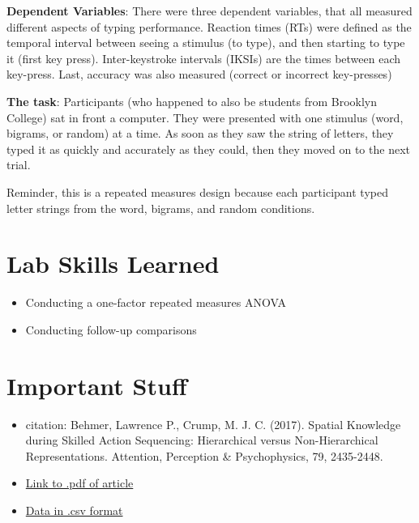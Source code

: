 \documentclass[]{book}
\providecommand{\tightlist}{%
  \setlength{\itemsep}{0pt}\setlength{\parskip}{0pt}}
\theoremstyle{definition}
\theoremstyle{definition}
\theoremstyle{definition}
\theoremstyle{remark}
\begin{document}
\textbf{Dependent Variables}: There were three dependent variables, that
all measured different aspects of typing performance. Reaction times
(RTs) were defined as the temporal interval between seeing a stimulus
(to type), and then starting to type it (first key press).
Inter-keystroke intervals (IKSIs) are the times between each key-press.
Last, accuracy was also measured (correct or incorrect key-presses)

\textbf{The task}: Participants (who happened to also be students from
Brooklyn College) sat in front a computer. They were presented with one
stimulus (word, bigrams, or random) at a time. As soon as they saw the
string of letters, they typed it as quickly and accurately as they
could, then they moved on to the next trial.

Reminder, this is a repeated measures design because each participant
typed letter strings from the word, bigrams, and random conditions.

\section{Lab Skills Learned}\label{lab-skills-learned-3}

\begin{itemize}
\tightlist
\item
  Conducting a one-factor repeated measures ANOVA
\item
  Conducting follow-up comparisons
\end{itemize}

\section{Important Stuff}\label{important-stuff-3}

\begin{itemize}
\tightlist
\item
  citation: Behmer, Lawrence P., Crump, M. J. C. (2017). Spatial
  Knowledge during Skilled Action Sequencing: Hierarchical versus
  Non-Hierarchical Representations. Attention, Perception \&
  Psychophysics, 79, 2435-2448.
\item
  \href{https://github.com/CrumpLab/CrumpLab.github.io/raw/master/files/8753/Behmer\%20and\%20Crump\%20-\%202017.pdf}{Link
  to .pdf of article}
\item
  \href{https://github.com/CrumpLab/statisticsLab/raw/master/data/exp1_BehmerCrumpAPP.csv}{Data
  in .csv format}
\end{itemize}
\end{document}
